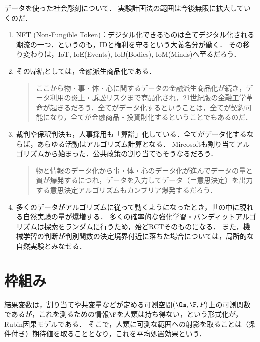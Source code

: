 \documentclass[uplatex,dvipdfmx]{jsreport}
\begin{document}
\begin{example}
    データを使った社会彫刻について．
    実験計画法の範囲は今後無限に拡大していくのだ．
    \begin{enumerate}
        \item NFT (Non-Fungible Token)：デジタル化できるものは全てデジタル化される潮流の一つ．というのも，IDと権利を守るという大義名分が働く．
        その移り変わりは，IoT, IoE(Events), IoB(Bodies), IoM(Minds)へ至るだろう．
        \item その帰結としては，金融派生商品化である．
        \begin{quote}
            ここから物・事・体・心に関するデータの金融派生商品化が続き，データ利用の炎上・訴訟リスクまで商品化され，21世紀版の金融工学革命が起きるだろう．全てがデータ化するということは，全てが契約可能になり，全てが金融商品・投資財化するということでもあるのだ．
        \end{quote}
        \item 裁判や保釈判決も，人事採用も「算譜」化している．全てがデータ化するならば，あらゆる活動はアルゴリズム計算となる．
        Mircosoftも割り当てアルゴリズムから始まった．公共政策の割り当てもそうなるだろう．
        \begin{quote}
            物と情報のデータ化から事・体・心のデータ化が進んでデータの量と質が爆発するにつれ，データを入力してデータ（＝意思決定）を出力する意思決定アルゴリズムもカンブリア爆発するだろう．
        \end{quote}
        \item 多くのデータがアルゴリズムに従って動くようになったとき，世の中に現れる自然実験の量が爆増する．
        多くの確率的な強化学習・バンディットアルゴリズムは探索をランダムに行うため，殆どRCTそのものになる．
        また，機械学習の判断が判別関数の決定境界付近に落ちた場合については，局所的な自然実験とみなせる．
    \end{enumerate}
\end{example}

\section{枠組み}

\begin{tcolorbox}[colframe=ForestGreen, colback=ForestGreen!10!white,breakable,colbacktitle=ForestGreen!40!white,coltitle=black,fonttitle=\bfseries\sffamily,
title=「潜在」の接頭語は，結果変数の確率変数化をいう．]
    結果変数は，割り当てや共変量などが定める可測空間$(\Om,\F,P)$上の可測関数であるが，これを測るための情報$\F$を人類は持ち得ない，という形式化が，Rubin因果モデルである．
    そこで，人類に可測な範囲への射影を取ることは（条件付き）期待値を取ることとなり，これを平均処置効果という．
\end{tcolorbox}
\end{document}
